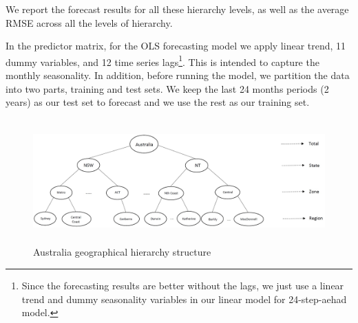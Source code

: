 \documentclass[11pt,a4paper,]{article}
\begin{document}
We report the forecast results for all these hierarchy levels, as well
as the average RMSE across all the levels of hierarchy.

In the predictor matrix, for the OLS forecasting model we apply linear
trend, 11 dummy variables, and 12 time series lags\footnote{Since the
  forecasting results are better without the lags, we just use a linear
  trend and dummy seasonality variables in our linear model for
  24-step-aehad model.}. This is intended to capture the monthly
seasonality. In addition, before running the model, we partition the
data into two parts, training and test sets. We keep the last 24 months
periods (2 years) as our test set to forecast and we use the rest as our
training set.

\begin{figure}

{\centering \includegraphics[width=450px,height=180px]{Paper-Figures/Australian_hierarchy_structure} 

}

\caption{Australia geographical hierarchy structure}\label{fig:Australiahierarchystructure}
\end{figure}
\end{document}
